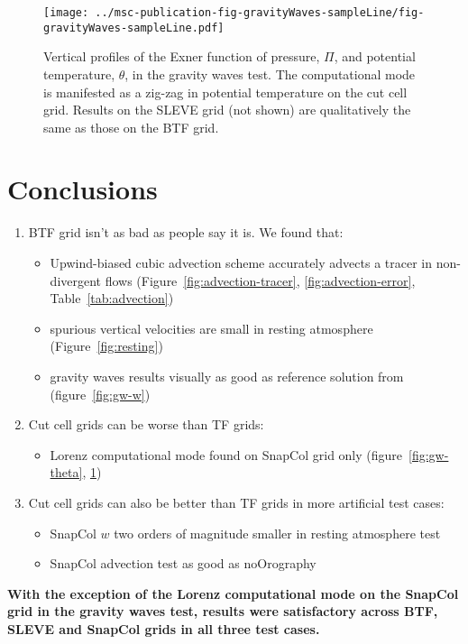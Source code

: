 \documentclass[twocol]{ametsoc}
\begin{document}
\begin{figure}
	\centering
	\texttt{[image: ../msc-publication-fig-gravityWaves-sampleLine/fig-gravityWaves-sampleLine.pdf]}
%
	\caption{Vertical profiles of the Exner function of pressure, $\Pi$, and potential temperature, $\theta$, in the gravity waves test.  The computational mode is manifested as a zig-zag in potential temperature on the cut cell grid.  Results on the SLEVE grid (not shown) are qualitatively the same as those on the BTF grid.}
	\label{fig:gw-exner-theta}
\end{figure}


\section{Conclusions}
\begin{enumerate}
	\item BTF grid isn't as bad as people say it is.  We found that:
	\begin{itemize}
		\item Upwind-biased cubic advection scheme accurately advects a tracer in non-divergent flows (Figure~\ref{fig:advection-tracer}, \ref{fig:advection-error}, Table~\ref{tab:advection})
		\item spurious vertical velocities are small in resting atmosphere (Figure~\ref{fig:resting})
		\item gravity waves results visually as good as reference solution from \citet{melvin2010} (figure~\ref{fig:gw-w})
	\end{itemize}

	\item Cut cell grids can be worse than TF grids:
	\begin{itemize}
		\item Lorenz computational mode found on SnapCol grid only (figure~\ref{fig:gw-theta}, \ref{fig:gw-exner-theta})
	\end{itemize}

	\item Cut cell grids can also be better than TF grids in more artificial test cases:
	\begin{itemize}
		\item SnapCol $w$ two orders of magnitude smaller in resting atmosphere test
		\item SnapCol advection test as good as noOrography
	\end{itemize}
\end{enumerate}

\textbf{With the exception of the Lorenz computational mode on the SnapCol grid in the gravity waves test, results were satisfactory across BTF, SLEVE and SnapCol grids in all three test cases.}
\end{document}

